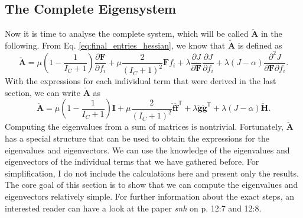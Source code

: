 {{{\subsection{The Complete Eigensystem}
Now it is time to analyse the complete system, which will be called $\mathbf{\check{A}}$ in the following. From Eq. \eqref{eq:final_entries_hessian}, we know that $\mathbf{\check{A}}$ is defined as
\[
\mathbf{\check{A}} =  \mu \left( 1 - \frac{1}{I_{C} + 1}\right) \frac{\partial \mathbf{F}}{\partial f_i} + \mu \frac{2}{\left(I_{C} + 1\right)^2} \mathbf{F} f_i + \lambda \frac{\partial J}{\partial \mathbf{F}} \frac{\partial J}{\partial f_i} + \lambda (J- \alpha) \frac{\partial^2 J}{\partial \mathbf{F}\partial f_i}.
\]
With the expressions for each individual term that were derived in the last section, we can write $\mathbf{\check{A}}$ as
\[
	\mathbf{\check{A}} = \mu \left(1-\frac{1}{I_C+1} \right) \mathbf{I} + \mu \frac{2}{(I_C +1)^2} \mathbf{\check{f}\check{f}}^\mathsf{T} + \lambda \mathbf{\check{g}\check{g}}^\mathsf{T} + \lambda (J-\alpha) \mathbf{\check{H}}.
\]
Computing the eigenvalues from a sum of matrices is nontrivial. Fortunately, $\mathbf{\check{A}}$ has a special structure that can be used to obtain the expressions for the eigenvalues and eigenvectors. We can use the knowledge of the eigenvalues and eigenvectors of the individual terms that we have gathered before. For simplification, I do not include the calculations here and present only the results. The core goal of this section is to show that we can compute the eigenvalues and eigenvectors relatively simple. For further information about the exact steps, an interested reader can have a look at the paper \textit{\acrshort{snh}} on p. 12:7 and 12:8.

}}}
